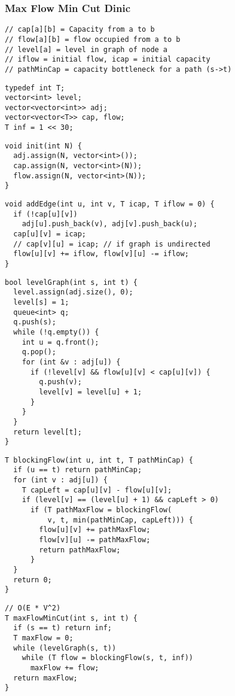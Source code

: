 \documentclass[twoside]{article}
\begin{document}
\begin{multicols*}{2}
\subsubsectionfont{\large\bfseries\sffamily\underline}
\subsubsection*{Max Flow Min Cut Dinic}
\begin{verbatim}
// cap[a][b] = Capacity from a to b
// flow[a][b] = flow occupied from a to b
// level[a] = level in graph of node a
// iflow = initial flow, icap = initial capacity
// pathMinCap = capacity bottleneck for a path (s->t)
\end{verbatim}
\vspace{-12pt}
\begin{verbatim}
typedef int T;
vector<int> level;
vector<vector<int>> adj;
vector<vector<T>> cap, flow;
T inf = 1 << 30;
\end{verbatim}
\vspace{-12pt}
\begin{verbatim}
void init(int N) {
  adj.assign(N, vector<int>());
  cap.assign(N, vector<int>(N));
  flow.assign(N, vector<int>(N));
}
\end{verbatim}
\vspace{-12pt}
\begin{verbatim}
void addEdge(int u, int v, T icap, T iflow = 0) {
  if (!cap[u][v])
    adj[u].push_back(v), adj[v].push_back(u);
  cap[u][v] = icap;
  // cap[v][u] = icap; // if graph is undirected
  flow[u][v] += iflow, flow[v][u] -= iflow;
}
\end{verbatim}
\vspace{-12pt}
\begin{verbatim}
bool levelGraph(int s, int t) {
  level.assign(adj.size(), 0);
  level[s] = 1;
  queue<int> q;
  q.push(s);
  while (!q.empty()) {
    int u = q.front();
    q.pop();
    for (int &v : adj[u]) {
      if (!level[v] && flow[u][v] < cap[u][v]) {
        q.push(v);
        level[v] = level[u] + 1;
      }
    }
  }
  return level[t];
}
\end{verbatim}
\vspace{-12pt}
\begin{verbatim}
T blockingFlow(int u, int t, T pathMinCap) {
  if (u == t) return pathMinCap;
  for (int v : adj[u]) {
    T capLeft = cap[u][v] - flow[u][v];
    if (level[v] == (level[u] + 1) && capLeft > 0)
      if (T pathMaxFlow = blockingFlow(
          v, t, min(pathMinCap, capLeft))) {
        flow[u][v] += pathMaxFlow;
        flow[v][u] -= pathMaxFlow;
        return pathMaxFlow;
      }
  }
  return 0;
}
\end{verbatim}
\vspace{-12pt}
\begin{verbatim}
// O(E * V^2)
T maxFlowMinCut(int s, int t) {
  if (s == t) return inf;
  T maxFlow = 0;
  while (levelGraph(s, t))
    while (T flow = blockingFlow(s, t, inf))
      maxFlow += flow;
  return maxFlow;
}
\end{verbatim}


\end{multicols*}
\end{document}
